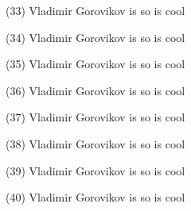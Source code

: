 \documentclass{article}%
\begin{document}
\begin{minipage}{0.3333333333333333\textwidth}%
(33) Vladimir Gorovikov%
\newline%
%
is so%
\newline%
%
is cool%
\newline%
%
\end{minipage}%
\newline%
\begin{minipage}{0.3333333333333333\textwidth}%
(34) Vladimir Gorovikov%
\newline%
%
is so%
\newline%
%
is cool%
\newline%
%
\end{minipage}%
\begin{minipage}{0.3333333333333333\textwidth}%
(35) Vladimir Gorovikov%
\newline%
%
is so%
\newline%
%
is cool%
\newline%
%
\end{minipage}%
\begin{minipage}{0.3333333333333333\textwidth}%
(36) Vladimir Gorovikov%
\newline%
%
is so%
\newline%
%
is cool%
\newline%
%
\end{minipage}%
\newline%
\begin{minipage}{0.3333333333333333\textwidth}%
(37) Vladimir Gorovikov%
\newline%
%
is so%
\newline%
%
is cool%
\newline%
%
\end{minipage}%
\begin{minipage}{0.3333333333333333\textwidth}%
(38) Vladimir Gorovikov%
\newline%
%
is so%
\newline%
%
is cool%
\newline%
%
\end{minipage}%
\begin{minipage}{0.3333333333333333\textwidth}%
(39) Vladimir Gorovikov%
\newline%
%
is so%
\newline%
%
is cool%
\newline%
%
\end{minipage}%
\newline%
\begin{minipage}{0.3333333333333333\textwidth}%
(40) Vladimir Gorovikov%
\newline%
%
is so%
\newline%
%
is cool%
\newline%
%
\end{minipage}%
\end{document}
